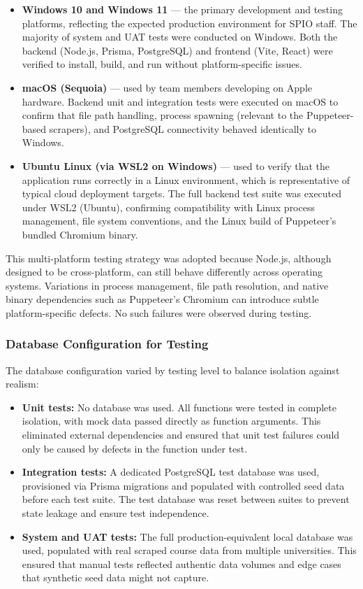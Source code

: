 \begin{itemize}
    \item \textbf{Windows 10 and Windows 11} --- the primary development and testing platforms, reflecting the expected production environment for SPIO staff. The majority of system and UAT tests were conducted on Windows. Both the backend (Node.js, Prisma, PostgreSQL) and frontend (Vite, React) were verified to install, build, and run without platform-specific issues.
    \item \textbf{macOS (Sequoia)} --- used by team members developing on Apple hardware. Backend unit and integration tests were executed on macOS to confirm that file path handling, process spawning (relevant to the Puppeteer-based scrapers), and PostgreSQL connectivity behaved identically to Windows.
    \item \textbf{Ubuntu Linux (via WSL2 on Windows)} --- used to verify that the application runs correctly in a Linux environment, which is representative of typical cloud deployment targets. The full backend test suite was executed under WSL2 (Ubuntu), confirming compatibility with Linux process management, file system conventions, and the Linux build of Puppeteer's bundled Chromium binary.
\end{itemize}

\noindent This multi-platform testing strategy was adopted because Node.js, although designed to be cross-platform, can still behave differently across operating systems. Variations in process management, file path resolution, and native binary dependencies such as Puppeteer’s Chromium can introduce subtle platform-specific defects. No such failures were observed during testing.

\subsubsection*{Database Configuration for Testing}

The database configuration varied by testing level to balance isolation against realism:

\begin{itemize}
    \item \textbf{Unit tests:} No database was used. All functions were tested in complete isolation, with mock data passed directly as function arguments. This eliminated external dependencies and ensured that unit test failures could only be caused by defects in the function under test.
    \item \textbf{Integration tests:} A dedicated PostgreSQL test database was used, provisioned via Prisma migrations and populated with controlled seed data before each test suite. The test database was reset between suites to prevent state leakage and ensure test independence.
    \item \textbf{System and UAT tests:} The full production-equivalent local database was used, populated with real scraped course data from multiple universities. This ensured that manual tests reflected authentic data volumes and edge cases that synthetic seed data might not capture.
\end{itemize}

